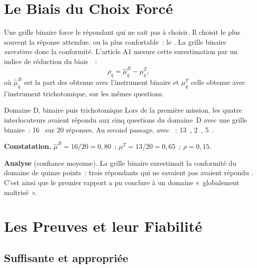 \section{Le Biais du Choix Forcé}
\label{sec:c10-biais}

Une grille binaire force le répondant qui ne sait pas à choisir. Il choisit
le plus souvent la réponse attendue, ou la plus confortable~: le \OUI{}. La
grille binaire \emph{surestime} donc la conformité. L'article A1 mesure cette
surestimation par un indice de réduction du biais~\cite{minka2026nek}~:
\[
    \rho_q = \hat{\mu}_q^{B} - \mu_q^{T},
\]
où $\hat{\mu}_q^{B}$ est la part des \OUI{} obtenue avec l'instrument binaire et
$\mu_q^{T}$ celle obtenue avec l'instrument trichotomique, sur les mêmes
questions.

\begin{boxlecture}{Domaine D, binaire puis trichotomique}
Lors de la première mission, les quatre interlocuteurs avaient répondu aux
cinq questions du domaine~D avec une grille binaire~: 16~\OUI{} sur 20
réponses. Au second passage, avec \NEK{}~: 13~\OUI{}, 2~\NON{}, 5~\NEK{}.

\medskip
\textbf{Constatation.} $\hat{\mu}^{B} = 16/20 = 0{,}80$~; $\mu^{T} = 13/20 =
0{,}65$~; $\rho = 0{,}15$.

\medskip
\textbf{Analyse} (confiance moyenne). La grille binaire surestimait la
conformité du domaine de quinze points~: trois répondants qui ne savaient
pas avaient répondu \OUI{}. C'est ainsi que le premier rapport a pu conclure
à un domaine «~globalement maîtrisé~».

\medskip
\hfill{}
\end{boxlecture}

\section{Les Preuves et leur Fiabilité}
\label{sec:c10-preuves}

\subsection{Suffisante et appropriée}

